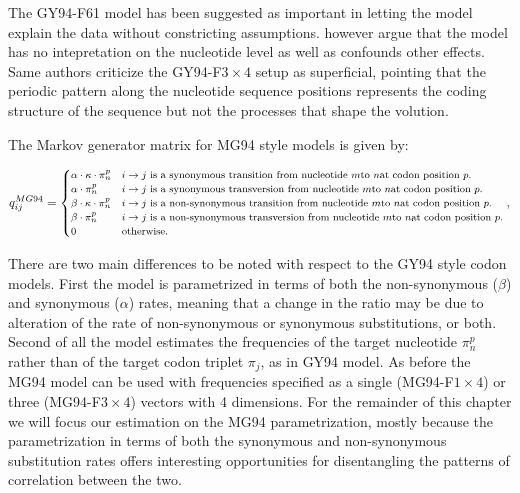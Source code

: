 The GY94-F61 model has been suggested as important in letting the model explain the data without constricting assumptions.
\citet{Rodrigue2008} however argue that the model has no intepretation on the nucleotide level as well as confounds other effects. 
Same authors criticize the GY94-F$3\times4$ setup as superficial, pointing that the periodic pattern along the nucleotide sequence positions represents the coding structure of the sequence but not the processes that shape the volution.

The Markov generator matrix for MG94 style models \citep{Muse1994} is given by:

\begin{equation}
\footnotesize{
q_{ij}^{MG94}=\begin{cases}
\alpha\cdot\kappa\cdot\pi_{n}^{p} & i\rightarrow j\text{ is a synonymous transition from nucleotide \ensuremath{m}to \ensuremath{n}at codon position \ensuremath{p}.}\\
\alpha\cdot\pi_{n}^{p} & i\rightarrow j\text{ is a synonymous transversion from nucleotide \ensuremath{m}to \ensuremath{n}at codon position \ensuremath{p}.}\\
\beta\cdot\kappa\cdot\pi_{n}^{p} & i\rightarrow j\text{ is a non-synonymous transition from nucleotide \ensuremath{m}to \ensuremath{n}at codon position \ensuremath{p}.}\\
\beta\cdot\pi_{n}^{p} & i\rightarrow j\text{ is a non-synonymous transversion from nucleotide \ensuremath{m}to \ensuremath{n}at codon position \ensuremath{p}.}\\
0 & \text{otherwise.}
\end{cases},
} %
\label{eq:gy94}
\end{equation}


There are two main differences to be noted with respect to the GY94 style codon models.
First the model is parametrized in terms of both the non-synonymous ($\beta$) and synonymous ($\alpha$) rates, meaning that a change in the ratio may be due to alteration of the rate of non-synonymous or synonymous substitutions, or both.
Second of all the model estimates the frequencies of the target nucleotide $\pi_{n}^{p}$ rather than of the target codon triplet $\pi_{j}$, as in GY94 model.
As before the MG94 model can be used with frequencies specified as a single (MG94-F$1\times4$) or three (MG94-F$3\times4$) vectors with 4 dimensions.
For the remainder of this chapter we will focus our estimation on the MG94 parametrization, mostly because the parametrization in terms of both the synonymous and non-synonymous substitution rates offers interesting opportunities for disentangling
the patterns of correlation between
the two.


